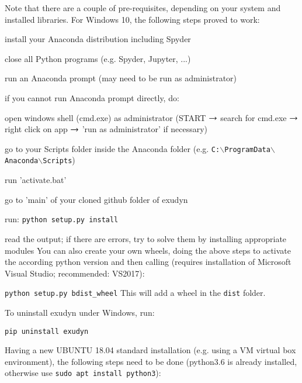 

Note that there are a couple of pre-requisites, depending on your system and installed libraries. For Windows 10, the following steps proved to work:
\bi
  \item install your Anaconda distribution including Spyder
  \item close all Python programs (e.g. Spyder, Jupyter, ...)
	\item run an Anaconda prompt (may need to be run as administrator)
	\item if you cannot run Anaconda prompt directly, do:
	\bi
	  \item open windows shell (cmd.exe) as administrator (START $\rightarrow$ search for cmd.exe $\rightarrow$ right click on app $\rightarrow$ 'run as administrator' if necessary)
		\item go to your Scripts folder inside the Anaconda folder (e.g. \texttt{C:$\backslash$ProgramData$\backslash$Anaconda$\backslash$Scripts})
	  \item run 'activate.bat'
	\ei
	\item go to 'main' of your cloned github folder of exudyn
	\item run: \texttt{python setup.py install}
	\item read the output; if there are errors, try to solve them by installing appropriate modules
\ei
You can also create your own wheels, doing the above steps to activate the according python version and then calling (requires installation of Microsoft Visual Studio; recommended: VS2017):
\bi
  \item[] \texttt{python setup.py bdist\_wheel}
\ei
This will add a wheel in the \texttt{dist} folder.

To uninstall exudyn under Windows, run:
\bi
  \item[] \texttt{pip uninstall exudyn}
\ei


Having a new UBUNTU 18.04 standard installation (e.g. using a VM virtual box environment), the following steps need to be done (python3.6 is already installed, otherwise use \texttt{sudo apt install python3}):

